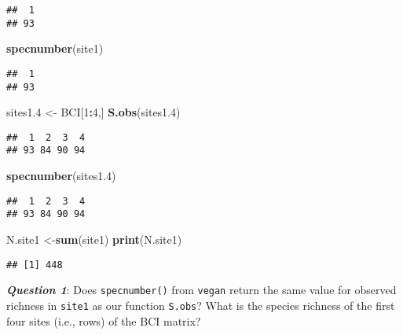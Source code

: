 \documentclass[
]{article}
\newenvironment{Shaded}{\begin{snugshade}}{\end{snugshade}}
\newcommand{\DecValTok}[1]{\textcolor[rgb]{0.00,0.00,0.81}{#1}}
\newcommand{\FloatTok}[1]{\textcolor[rgb]{0.00,0.00,0.81}{#1}}
\newcommand{\FunctionTok}[1]{\textcolor[rgb]{0.13,0.29,0.53}{\textbf{#1}}}
\newcommand{\NormalTok}[1]{#1}
\newcommand{\OtherTok}[1]{\textcolor[rgb]{0.56,0.35,0.01}{#1}}
\newcommand{\SpecialCharTok}[1]{\textcolor[rgb]{0.81,0.36,0.00}{\textbf{#1}}}
\begin{document}
\begin{verbatim}
##  1 
## 93
\end{verbatim}

\begin{Shaded}
\begin{Highlighting}[]
\FunctionTok{specnumber}\NormalTok{(site1)}
\end{Highlighting}
\end{Shaded}

\begin{verbatim}
##  1 
## 93
\end{verbatim}

\begin{Shaded}
\begin{Highlighting}[]
\NormalTok{sites1}\FloatTok{.4} \OtherTok{\textless{}{-}}\NormalTok{ BCI[}\DecValTok{1}\SpecialCharTok{:}\DecValTok{4}\NormalTok{,]}
\FunctionTok{S.obs}\NormalTok{(sites1}\FloatTok{.4}\NormalTok{)}
\end{Highlighting}
\end{Shaded}

\begin{verbatim}
##  1  2  3  4 
## 93 84 90 94
\end{verbatim}

\begin{Shaded}
\begin{Highlighting}[]
\FunctionTok{specnumber}\NormalTok{(sites1}\FloatTok{.4}\NormalTok{)}
\end{Highlighting}
\end{Shaded}

\begin{verbatim}
##  1  2  3  4 
## 93 84 90 94
\end{verbatim}

\begin{Shaded}
\begin{Highlighting}[]
\NormalTok{N.site1 }\OtherTok{\textless{}{-}}\FunctionTok{sum}\NormalTok{(site1)}
\FunctionTok{print}\NormalTok{(N.site1)}
\end{Highlighting}
\end{Shaded}

\begin{verbatim}
## [1] 448
\end{verbatim}

\textbf{\emph{Question 1}}: Does \texttt{specnumber()} from
\texttt{vegan} return the same value for observed richness in
\texttt{site1} as our function \texttt{S.obs}? What is the species
richness of the first four sites (i.e., rows) of the BCI matrix?
\end{document}

